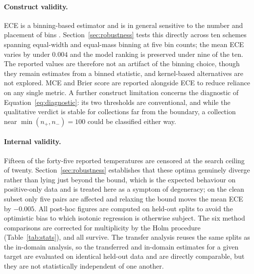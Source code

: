 \documentclass[sn-mathphys-num,pdflatex]{sn-jnl}
\begin{document}
\paragraph{Construct validity.}
ECE is a binning-based estimator and is in general sensitive to the number and
placement of bins \cite{nixon2019,roelofs2022}. Section~\ref{sec:robustness} tests
this directly across ten schemes spanning equal-width and equal-mass binning at five
bin counts; the mean ECE varies by under $0.004$ and the model ranking is preserved
under nine of the ten. The reported values are therefore not an artifact of the
binning choice, though they remain estimates from a binned statistic, and
kernel-based alternatives are not explored. MCE and Brier score are reported
alongside ECE to reduce reliance on any single metric. A further construct
limitation concerns the diagnostic of Equation~\eqref{eq:diagnostic}: its two
thresholds are conventional, and while the qualitative verdict is stable for
collections far from the boundary, a collection near $\min(n_+,n_-) = 100$ could be
classified either way.

\paragraph{Internal validity.}
Fifteen of the forty-five reported temperatures are censored at the search ceiling
of twenty. Section~\ref{sec:robustness} establishes that these optima genuinely
diverge rather than lying just beyond the bound, which is the expected behaviour on
positive-only data and is treated here as a symptom of degeneracy; on the clean
subset only five pairs are affected and relaxing the bound moves the mean ECE by
$-0.005$. All post-hoc figures are computed on held-out splits to avoid the
optimistic bias to which isotonic regression is otherwise subject. The six method
comparisons are corrected for multiplicity by the Holm procedure
(Table~\ref{tab:stats}), and all survive. The transfer analysis reuses the same
splits as the in-domain analysis, so the transferred and in-domain estimates for a
given target are evaluated on identical held-out data and are directly comparable,
but they are not statistically independent of one another.
\end{document}
